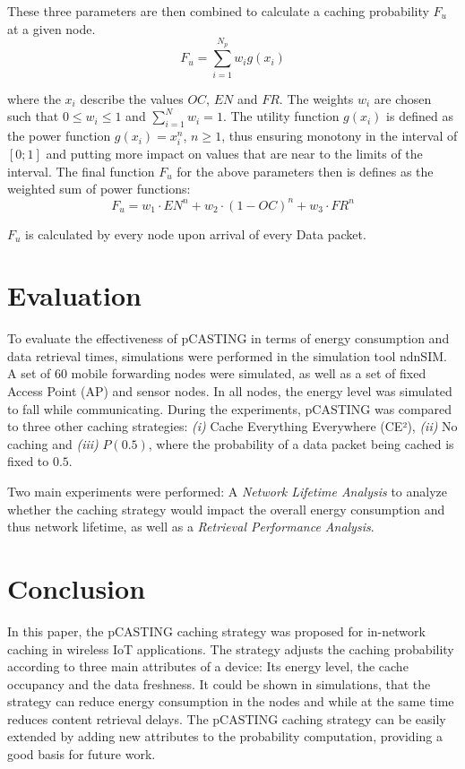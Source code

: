 \documentclass[conference]{IEEEtran}
\begin{document}
These three parameters are then combined to calculate a caching probability $F_u$ at a given node.
\begin{equation}
	F_u = \sum_{i = 1}^{N_p} w_i g(x_i)
\end{equation}

where the $x_i$ describe the values $OC$, $EN$ and $FR$. The weights $w_i$ are chosen such that $0 \leq w_i \leq 1$ and $\sum_{i = 1}^{N} w_i = 1$. The utility function $g(x_i)$ is defined as the power function $g(x_i) = x_i^n$, $n \geq 1$, thus ensuring monotony in the interval of $[0; 1]$ and putting more impact on values that are near to the limits of the interval. The final function $F_u$ for the above parameters then is defines as the weighted sum of power functions:
\begin{equation}
	F_u = w_1 \cdot EN^n + w_2 \cdot (1 - OC)^n + w_3 \cdot FR^n
\end{equation}

$F_u$ is calculated by every node upon arrival of every Data packet.

\section{Evaluation}
\label{sec:eval}

To evaluate the effectiveness of {pCASTING} in terms of energy consumption and data retrieval times, simulations were performed in the simulation tool {ndnSIM}. A set of 60 mobile forwarding nodes were simulated, as well as a set of fixed Access Point (AP) and sensor nodes. In all nodes, the energy level was simulated to fall while communicating. During the experiments, {pCASTING} was compared to three other caching strategies: \textit{(i)} Cache Everything Everywhere (CE²), \textit{(ii)} No caching and \textit{(iii)} $P(0.5)$, where the probability of a data packet being cached is fixed to $0.5$.

Two main experiments were performed: A \textit{Network Lifetime Analysis} to analyze whether the caching strategy would impact the overall energy consumption and thus network lifetime, as well as a \textit{Retrieval Performance Analysis}. 

\section{Conclusion}
\label{sec:conclusion}

In this paper, the {pCASTING} caching strategy was proposed for in-network caching in wireless IoT applications. The strategy adjusts the caching probability according to three main attributes of a device: Its energy level, the cache occupancy and the data freshness. It could be shown in simulations, that the strategy can reduce energy consumption in the nodes and while at the same time reduces content retrieval delays. The {pCASTING} caching strategy can be easily extended by adding new attributes to the probability computation, providing a good basis for future work.

\printbibliography
\end{document}
